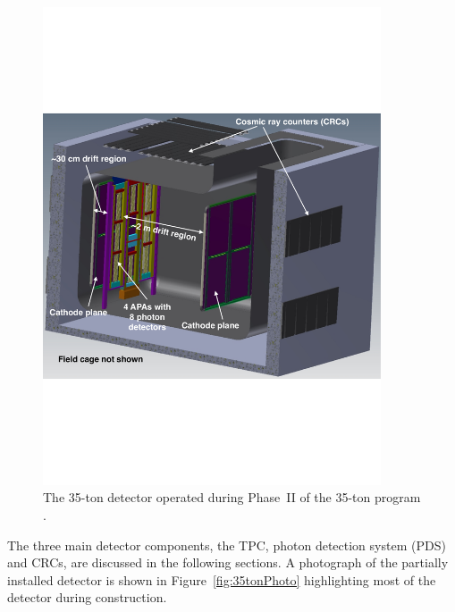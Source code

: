 \begin{figure}
  \centering
  \includegraphics[width=10cm]{35tonDetector.pdf}
  \caption[The 35-ton detector operated during Phase~II of the 35-ton programme.]{The 35-ton detector operated during Phase~II of the 35-ton program \cite{35tonPhaseINeutrino2014}.}
  \label{fig:35tonDetector}
\end{figure}

The three main detector components, the TPC, photon detection system (PDS) and CRCs, are discussed in the following sections.  A photograph of the partially installed detector is shown in Figure~\ref{fig:35tonPhoto} highlighting most of the detector during construction.


